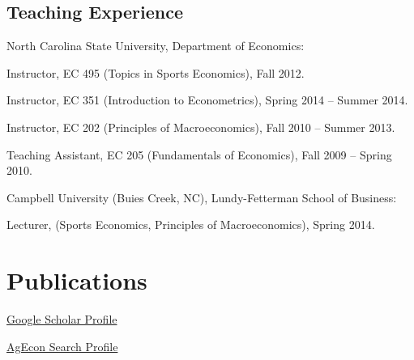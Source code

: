 \documentclass[letterpaper]{article}
\renewenvironment{itemize}{
  \begin{list}{}{
    \setlength{\leftmargin}{1.5em}
  }
}{
  \end{list}
}
\begin{document}
\subsection*{Teaching Experience}
\begin{itemize}
\item North Carolina State University, Department of Economics:
\begin{itemize}
\item Instructor, EC 495 (Topics in Sports Economics), Fall 2012.
\item Instructor, EC 351 (Introduction to Econometrics), Spring 2014 -- Summer 2014.
\item Instructor, EC 202 (Principles of Macroeconomics), Fall 2010 -- Summer 2013.
\item Teaching Assistant, EC 205 (Fundamentals of Economics), Fall 2009 -- Spring 2010.
\end{itemize}

\item Campbell University (Buies Creek, NC), Lundy-Fetterman School of Business:
\begin{itemize}
\item Lecturer, (Sports Economics, Principles of Macroeconomics), Spring 2014.
\end{itemize}
\end{itemize}

\section*{Publications}

\begin{itemize}
\item \href{https://scholar.google.com/citations?user=4e7if58AAAAJ&hl=en}{Google Scholar Profile}
\item \href{https://ageconsearch.umn.edu/search?ln=en&p=dinterman&f=&sf=&so=d&rg=10}{AgEcon Search Profile}
\end{itemize}
\end{document}
